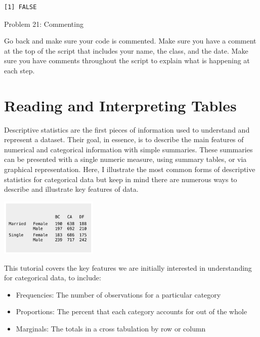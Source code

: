 \documentclass[
  letterpaper,
  DIV=11,
  numbers=noendperiod]{scrreprt}
\providecommand{\tightlist}{%
  \setlength{\itemsep}{0pt}\setlength{\parskip}{0pt}}\usepackage{longtable,booktabs,array}
\begin{document}
\begin{verbatim}
[1] FALSE
\end{verbatim}

Problem 21: Commenting

Go back and make sure your code is commented. Make sure you have a
comment at the top of the script that includes your name, the class, and
the date. Make sure you have comments throughout the script to explain
what is happening at each step.


\chapter*{Reading and Interpreting
Tables}\label{reading-and-interpreting-tables}


Descriptive statistics are the first pieces of information used to
understand and represent a dataset. Their goal, in essence, is to
describe the main features of numerical and categorical information with
simple summaries. These summaries can be presented with a single numeric
measure, using summary tables, or via graphical representation. Here, I
illustrate the most common forms of descriptive statistics for
categorical data but keep in mind there are numerous ways to describe
and illustrate key features of data.

\includegraphics[width=0.35\textwidth,height=\textheight]{./images/Daily-6-Pic-1.jpg}

This tutorial covers the key features we are initially interested in
understanding for categorical data, to include:

\begin{itemize}
\tightlist
\item
  Frequencies: The number of observations for a particular category
\item
  Proportions: The percent that each category accounts for out of the
  whole
\item
  Marginals: The totals in a cross tabulation by row or column
\end{itemize}
\end{document}
